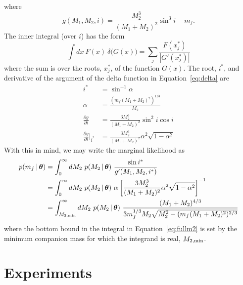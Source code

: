 \documentclass[letterpaper,12pt,preprint]{aastex}
\newcommand{\given}{\,|\,}
\newcommand{\bs}[1]{\boldsymbol{#1}}
\begin{document}
where
\begin{equation}
	g(M_1,M_2,i) = \frac{M_2^3}{(M_1+M_2)^2}\sin^3 i - m_f.
\end{equation}
The inner integral (over $i$) has the form
\begin{equation}
    \int dx~F(x)~\delta{(G(x)}) = \sum_j \frac{F(x^*_j)}{|G'(x^*_j)|}
\end{equation}
where the sum is over the roots, $x^*_j$, of the function $G(x)$. The root, $i^*$, and derivative of the argument of the delta function in Equation~\ref{eq:delta} are 
\begin{align}
	i^* &= \sin^{-1}\alpha\\
	\alpha &= \frac{(m_f(M_1+M_2)^2)^{1/3}}{M_2}\\
	\frac{\partial g}{\partial i} &= \frac{3M_2^3}{(M_1+M_2)^2}\sin^2 i \cos i\\
	\frac{\partial g}{\partial i}\bigg\rvert_{i^*} &= \frac{3M_2^3}{(M_1+M_2)^2} \alpha^2 \sqrt{1 - \alpha^2}
\end{align}
With this in mind, we may write the marginal likelihood as
\begin{align}
	p(m_f \given \bs{\theta}) &= \int_{0}^\infty dM_2~p(M_2 \given \bs{\theta})~\frac{\sin i^*}{g'(M_1,M_2,i^*)}\\
	&= \int_{0}^\infty dM_2~p(M_2 \given \bs{\theta})~\alpha\left[\frac{3M_2^3}{(M_1+M_2)^2} \alpha^2 \sqrt{1 - \alpha^2}\right]^{-1}\\
	&= \int_{M_{2,{\rm min}}}^\infty dM_2~p(M_2 \given \bs{\theta})~\frac{(M_1+M_2)^{4/3}}{3m_f^{1/3}M_2\sqrt{M_2^2 - (m_f(M_1+M_2)^2)^{2/3}}}\label{eq:fullm2}
\end{align}
where the bottom bound in the integral in Equation~\ref{eq:fullm2} is set by the minimum companion mass for which the integrand is real, $M_{2,{\rm min}}$.

\section{Experiments} \label{sec:experiments}
\end{document}
